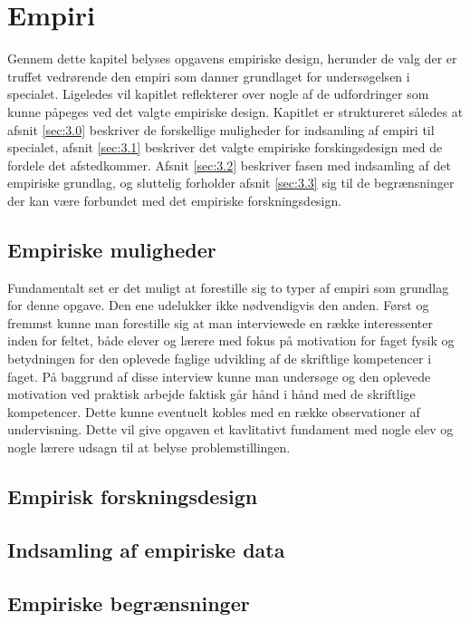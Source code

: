 \chapter{Empiri}
\label{Ch:3}

Gennem dette kapitel belyses opgavens empiriske design, herunder de valg der er truffet vedrørende den empiri som danner grundlaget for undersøgelsen i specialet. Ligeledes vil kapitlet reflekterer over nogle af de udfordringer som kunne påpeges ved det valgte empiriske design. Kapitlet er struktureret således at afsnit \vref{sec:3.0} beskriver de forskellige muligheder for indsamling af empiri til specialet, afsnit \vref{sec:3.1} beskriver det valgte empiriske forskingsdesign med de fordele det afstedkommer. Afsnit \vref{sec:3.2} beskriver fasen med indsamling af det empiriske grundlag, og sluttelig forholder afsnit \vref{sec:3.3} sig til de begrænsninger der kan være forbundet med det empiriske forskningsdesign.

\section{Empiriske muligheder}
\label{sec:3.0}
Fundamentalt set er det muligt at forestille sig to typer af empiri som grundlag for denne opgave. Den ene udelukker ikke nødvendigvis den anden. Først og fremmst kunne man forestille sig at man interviewede en række interessenter inden for feltet, både elever og lærere med fokus på motivation for faget fysik og betydningen for den oplevede faglige udvikling af de skriftlige kompetencer i faget. På baggrund af disse interview kunne man undersøge og den oplevede motivation ved praktisk arbejde faktisk går hånd i hånd med de skriftlige kompetencer. Dette kunne eventuelt kobles med en række observationer af undervisning. Dette vil give opgaven et kavlitativt fundament med nogle elev og nogle lærere udsagn til at belyse problemstillingen.


\section{Empirisk forskningsdesign}
\label{sec:3.1}

\section{Indsamling af empiriske data}
\label{sec:3.2}

\section{Empiriske begrænsninger}
\label{sec:3.3}



